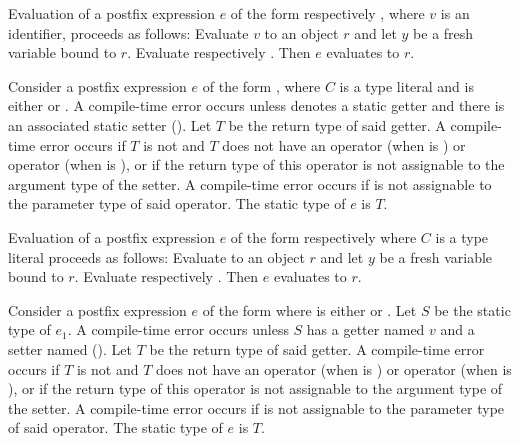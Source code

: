 \documentclass[makeidx]{article}
\begin{document}
{\LMHash{}%
Evaluation of a postfix expression $e$
of the form  respectively ,
where $v$ is an identifier, proceeds as follows:
Evaluate $v$ to an object $r$ and let $y$ be a fresh variable bound to $r$.
Evaluate  respectively .
Then $e$ evaluates to $r$.

\EndCase

\LMHash{}%
Consider a postfix expression $e$ of the form ,
where $C$ is a type literal and \op{} is either \lit{++} or \lit{-{}-}.
A compile-time error occurs unless  denotes a static getter
and there is an associated static setter 
().
Let $T$ be the return type of said getter.
A compile-time error occurs if $T$ is not \DYNAMIC{}
and $T$ does not have an operator \lit{+} (when \op{} is \lit{++})
or operator \lit{-} (when \op{} is \lit{-{}-}),
or if the return type of this operator is not assignable to
the argument type of the setter.
A compile-time error occurs if  is not assignable to
the parameter type of said operator.
The static type of $e$ is $T$.

\LMHash{}%
Evaluation of a postfix expression $e$
of the form  respectively 
where $C$ is a type literal proceeds as follows:
Evaluate  to an object $r$
and let $y$ be a fresh variable bound to $r$.
Evaluate  respectively .
Then $e$ evaluates to $r$.
\EndCase

\LMHash{}%
Consider a postfix expression $e$ of the form 
where \op{} is either \lit{++} or \lit{-{}-}.
Let $S$ be the static type of $e_1$.
A compile-time error occurs unless $S$ has
a getter named $v$ and a setter named 
().
Let $T$ be the return type of said getter.
A compile-time error occurs if $T$ is not \DYNAMIC{}
and $T$ does not have an operator \lit{+} (when \op{} is \lit{++})
or operator \lit{-} (when \op{} is \lit{-{}-}),
or if the return type of this operator is not assignable to
the argument type of the setter.
A compile-time error occurs if  is not assignable to
the parameter type of said operator.
The static type of $e$ is $T$.

}
\end{document}
